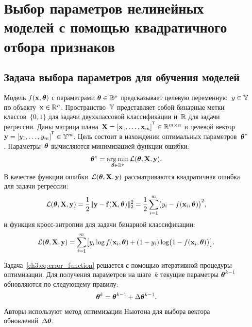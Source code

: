 \chapter{Выбор параметров нелинейных моделей с помощью квадратичного отбора признаков}
\label{chapter4}

\section{Задача выбора параметров для обучения моделей}

Модель $f( \mathbf{x}, \boldsymbol{\theta})$ с параметрами $\boldsymbol{\theta} \in \mathbb{R}^p$ предсказывает целевую переменную~$y \in \mathbb{Y}$ по объекту~$\mathbf{x} \in \mathbb{R}^{n}$. Пространство~$\mathbb{Y}$ представляет собой бинарные метки классов~$\{0, 1\}$ для задачи двухклассовой классификации и~$\mathbb{R}$ для задачи регрессии.
Даны матрица плана~$\bX = [\bx_1, \dots, \bx_m]^{\T} \in \bbR^{m \times n}$ и целевой вектор~$\by = [y_1, \dots, y_m]^{\T} \in \bbY^{m}$. 
Цель состоит в нахождении оптимальных параметров~$\boldsymbol{\theta}^*$.
Параметры~$\boldsymbol{\theta}$ вычисляются минимизацией функции ошибки:
\begin{equation}
\boldsymbol{\theta}^* = \mathop{\arg \min}\limits_{\boldsymbol{\theta} \in \mathbb{R}^p} \mathcal{L}(\boldsymbol{\theta}, \mathbf{X}, \mathbf{y}).
\label{ch3:eq:error_function}
\end{equation}
В качестве функции ошибки~$\mathcal{L} (\boldsymbol{\theta}, \mathbf{X}, \mathbf{y})$ рассматриваются квадратичная ошибка для задачи регрессии:
\begin{equation}
\mathcal{L}(\boldsymbol{\theta}, \mathbf{X}, \mathbf{y}) = \frac 12 \| \mathbf{y} - \mathbf{f}(\mathbf{X}, \boldsymbol{\theta}) \|_2^2 = \frac 12 \sum_{i=1}^m \bigl( y_i - f(\mathbf{x}_i,  \boldsymbol{\theta})\bigr)^2,
\label{ch3:eq:squared_error}
\end{equation}
и функция кросс-энтропии для задачи бинарной классификации: 
\begin{equation}
\mathcal{L}(\boldsymbol{\theta}, \mathbf{X}, \mathbf{y}) = \sum_{i=1}^m \bigl[y_i \log f (\mathbf{x}_i , \boldsymbol{\theta}) + (1-y_i) \log \bigl(1 - f (\mathbf{x}_i , \boldsymbol{\theta})\bigr)\bigr].
\label{ch3:eq:log_loss}
\end{equation}

Задача~\eqref{ch3:eq:error_function} решается с помощью итеративной процедуры оптимизации. 
Для получения параметров на шаге~$k$ текущие параметры $\boldsymbol{\theta}^{k-1}$ обновляются по следующему правилу:
\begin{equation}
\boldsymbol{\theta}^k = \boldsymbol{\theta}^{k - 1} + \Delta \boldsymbol{\theta}^{k - 1}.
\label{ch3:eq:update_rule}
\end{equation}
Авторы используют метод оптимизации Ньютона для выбора вектора обновлений~$\Delta \boldsymbol{\theta}$.

